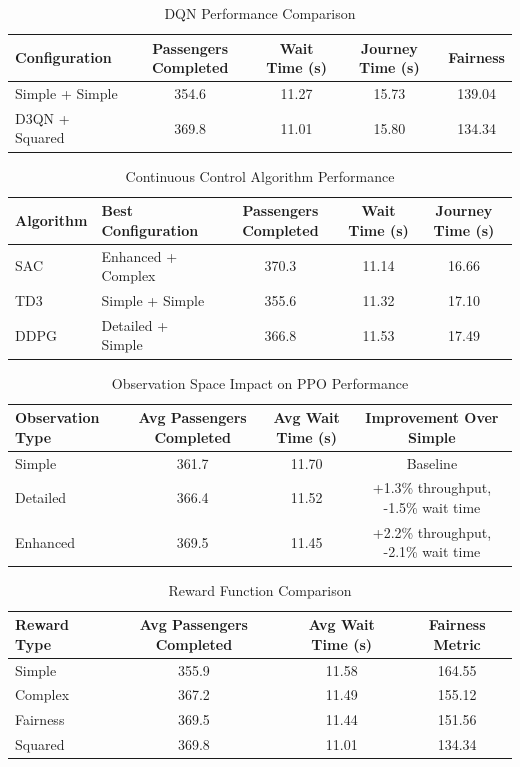 \documentclass[10pt,twocolumn]{article}
\begin{document}
\begin{table}[h!]
\centering
\caption{DQN Performance Comparison}
\label{tab:dqn-performance}
\begin{tabular}{l c c c c}
\hline
Configuration & Passengers Completed & Wait Time (s) & Journey Time (s) & Fairness \\
\hline
Simple + Simple & 354.6 & 11.27 & 15.73 & 139.04 \\
D3QN + Squared & 369.8 & 11.01 & 15.80 & 134.34 \\
\hline
\end{tabular}
\end{table}

\begin{table}[h!]
\centering
\caption{Continuous Control Algorithm Performance}
\label{tab:cont-performance}
\begin{tabular}{l l c c c}
\hline
Algorithm & Best Configuration & Passengers Completed & Wait Time (s) & Journey Time (s) \\
\hline
SAC & Enhanced + Complex & 370.3 & 11.14 & 16.66 \\
TD3 & Simple + Simple & 355.6 & 11.32 & 17.10 \\
DDPG & Detailed + Simple & 366.8 & 11.53 & 17.49 \\
\hline
\end{tabular}
\end{table}

\begin{table}[h!]
\centering
\caption{Observation Space Impact on PPO Performance}
\label{tab:obs-impact}
\begin{tabular}{l c c c}
\hline
Observation Type & Avg Passengers Completed & Avg Wait Time (s) & Improvement Over Simple \\
\hline
Simple & 361.7 & 11.70 & Baseline \\
Detailed & 366.4 & 11.52 & +1.3\% throughput, -1.5\% wait time \\
Enhanced & 369.5 & 11.45 & +2.2\% throughput, -2.1\% wait time \\
\hline
\end{tabular}
\end{table}

\begin{table}[h!]
\centering
\caption{Reward Function Comparison}
\label{tab:reward-effectiveness}
\begin{tabular}{l c c c}
\hline
Reward Type & Avg Passengers Completed & Avg Wait Time (s) & Fairness Metric \\
\hline
Simple & 355.9 & 11.58 & 164.55 \\
Complex & 367.2 & 11.49 & 155.12 \\
Fairness & 369.5 & 11.44 & 151.56 \\
Squared & 369.8 & 11.01 & 134.34 \\
\hline
\end{tabular}
\end{table}
\end{document}
